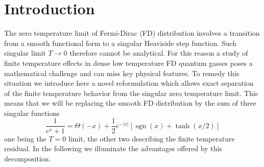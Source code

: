 \documentclass[sn-mathphys,Numbered]{sn-jnl}
\DeclareMathOperator{\sgn}{sgn}
\begin{document}
\date{January 2024, To be published in International Journal of Theoretical Physics}


\maketitle

\section{Introduction}
\label{sec1}




The zero temperature limit of Fermi-Dirac (FD) distribution involves a transition from a smooth functional form to a singular Heaviside step function. Such singular limit  $T\to 0$ therefore cannot be analytical. For this reason a study of finite temperature effects in dense low temperature FD quantum gasses poses a mathematical challenge and can miss key physical features. To remedy this situation we introduce here a novel reformulation which allows exact separation of the finite temperature behavior from the singular zero temperature limit. This means that we will be replacing the smooth FD distribution by the sum of three singular functions
$$
\boxed{\frac{1}{e^{x} +1}=\Theta(-x)+\frac{1}{2}e^{-|x|}\left[\sgn(x)+\tanh(x/2)\right]}
$$
one being the $T=0$ limit, the other two describing the finite temperature residual. In the following we illuminate the advantages offered by this decomposition.
\end{document}
